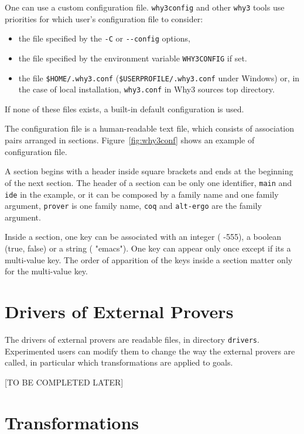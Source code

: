One can use a custom configuration file. \texttt{why3config}
and other \texttt{why3} tools use priorities for which
user's configuration file to consider:
\begin{itemize}
\item the file specified by the \texttt{-C} or \texttt{-{}-config} options,
\item the file specified by the environment variable
  \texttt{WHY3CONFIG} if set.
\item the file \texttt{\$HOME/.why3.conf}
  (\texttt{\$USERPROFILE/.why3.conf} under Windows) or, in the case of
  local installation, \texttt{why3.conf} in Why3 sources top directory.
\end{itemize}
If none of these files exists, a built-in default configuration is used.

The configuration file is a human-readable text file, which consists
of association pairs arranged in sections. Figure~\ref{fig:why3conf}
shows an example of configuration file.

A section begins with a header inside square brackets and ends at the
beginning of the next section. The header of a
section can be only one identifier, \texttt{main} and \texttt{ide} in
the example, or it can be composed by a family name and one family
argument, \texttt{prover} is one family name, \texttt{coq} and
\texttt{alt-ergo} are the family argument.

Inside a section, one key can be associated with an integer (\eg{} -555),
a boolean (true, false) or a string (\eg{} "emacs"). One key can appear
only once except if its a multi-value key. The order of apparition of
the keys inside a section matter only for the multi-value key.

\section{Drivers of External Provers}
\label{sec:drivers}

The drivers of external provers are readable files, in directory
\texttt{drivers}. Experimented users can modify them to change the way
the external provers are called, in particular which transformations
are applied to goals.

[TO BE COMPLETED LATER]

\section{Transformations}
\label{sec:transformations}

